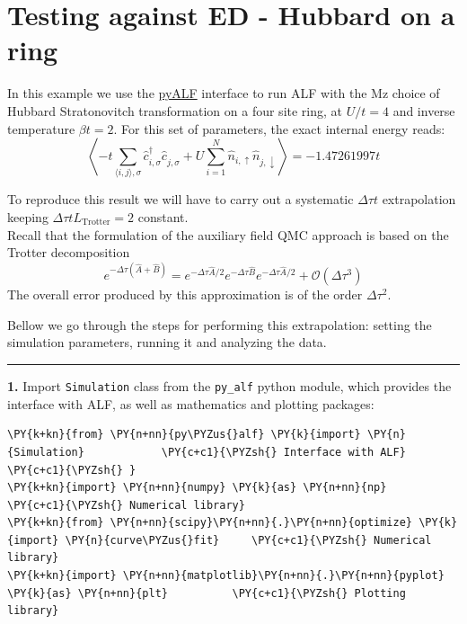     
    

    
    \hypertarget{testing-against-ed---hubbard-on-a-ring}{%
\section{Testing against ED - Hubbard on a
ring}\label{testing-against-ed---hubbard-on-a-ring}}

    In this example we use the
\href{https://git.physik.uni-wuerzburg.de/ALF/pyALF}{pyALF} interface to
run ALF with the Mz choice of Hubbard Stratonovitch transformation on a
four site ring, at \(U/t=4\) and inverse temperature \(\beta t = 2\).
For this set of parameters, the exact internal energy reads:\\
\[
 \left\langle -t \sum_{\langle i,j\rangle, \sigma} \hat{c}_{i,\sigma}^{\dagger} \hat{c}_{j,\sigma}^{\phantom\dagger}   +  U  \sum_{i=1}^{N} \hat{n}_{i,\uparrow}\hat{n}_{j,\downarrow}  \right\rangle  =   -1.47261997 t 
\]

To reproduce this result we will have to carry out a systematic
\(\Delta \tau t\) extrapolation keeping
\(\Delta \tau t L_\text{Trotter} = 2\) constant.\\
Recall that the formulation of the auxiliary field QMC approach is based
on the Trotter decomposition \[
e^{ -\Delta \tau \left( \hat{A} + \hat{B} \right) }  =  e^{ -\Delta \tau \hat{A}/2}  e^{ -\Delta \tau  \hat{B}  }   e^{ -\Delta \tau \hat{A}/2}  +  \mathcal{O} \left (\Delta  \tau^3\right)
\] The overall error produced by this approximation is of the order
\(\Delta \tau^2\).

Bellow we go through the steps for performing this extrapolation:
setting the simulation parameters, running it and analyzing the data.

\begin{center}\rule{0.5\linewidth}{\linethickness}\end{center}

\textbf{1.} Import \texttt{Simulation} class from the \texttt{py\_alf}
python module, which provides the interface with ALF, as well as
mathematics and plotting packages:

    \begin{tcolorbox}[breakable, size=fbox, boxrule=1pt, pad at break*=1mm,colback=cellbackground, colframe=cellborder]
\begin{Verbatim}[commandchars=\\\{\}]
\PY{k+kn}{from} \PY{n+nn}{py\PYZus{}alf} \PY{k}{import} \PY{n}{Simulation}            \PY{c+c1}{\PYZsh{} Interface with ALF}
\PY{c+c1}{\PYZsh{} }
\PY{k+kn}{import} \PY{n+nn}{numpy} \PY{k}{as} \PY{n+nn}{np}                       \PY{c+c1}{\PYZsh{} Numerical library}
\PY{k+kn}{from} \PY{n+nn}{scipy}\PY{n+nn}{.}\PY{n+nn}{optimize} \PY{k}{import} \PY{n}{curve\PYZus{}fit}     \PY{c+c1}{\PYZsh{} Numerical library}
\PY{k+kn}{import} \PY{n+nn}{matplotlib}\PY{n+nn}{.}\PY{n+nn}{pyplot} \PY{k}{as} \PY{n+nn}{plt}          \PY{c+c1}{\PYZsh{} Plotting library}
\end{Verbatim}
\end{tcolorbox}

